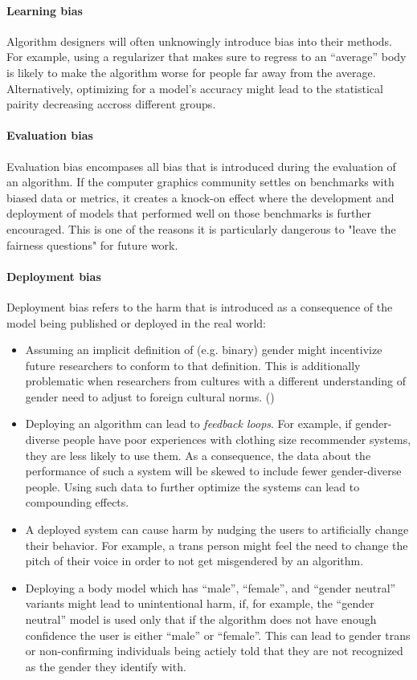 \documentclass[nonacm,sigconf,review,balance=false]{acmart}
\begin{document}
\paragraph*{Learning bias} Algorithm designers will often unknowingly introduce bias into their methods. For example, using a regularizer that makes sure to regress to an ``average'' body is likely to make the algorithm worse for people far away from the average. Alternatively, optimizing for a model's accuracy might lead to the statistical pairity decreasing accross different groups.

\paragraph*{Evaluation bias} Evaluation bias encompases all bias that is introduced during the evaluation of an algorithm. If the computer graphics community settles on benchmarks with biased data or metrics, it creates a knock-on effect where the development and deployment of models that performed well on those benchmarks is further encouraged. This is one of the reasons it is particularly dangerous to "leave the fairness questions" for future work.

\paragraph*{Deployment bias} Deployment bias refers to the harm that is introduced as a consequence of the model being published or deployed in the real world:
\begin{itemize}
    \item Assuming an implicit definition of (e.g. binary) gender might incentivize future researchers to conform to that definition. This is additionally problematic when researchers from cultures with a different understanding of gender need to adjust to foreign cultural norms. ()
    \item Deploying an algorithm can lead to \emph{feedback loops}. For example, if gender-diverse people have poor experiences with clothing size recommender systems, they are less likely to use them. As a consequence, the data about the performance of such a system will be skewed to include fewer gender-diverse people. Using such data to further optimize the systems can lead to compounding effects.
    \item A deployed system can cause harm by nudging the users to artificially change their behavior. For example, a trans person might feel the need to change the pitch of their voice in order to not get misgendered by an algorithm.
    \item Deploying a body model which has ``male'', ``female'', and ``gender neutral'' variants might lead to unintentional harm, if, for example, the ``gender neutral'' model is used only that if the algorithm does not have enough confidence the user is either ``male'' or ``female''. This can lead to gender trans or non-confirming individuals being actiely told that they are not recognized as the gender they identify with.
\end{itemize}
\end{document}

